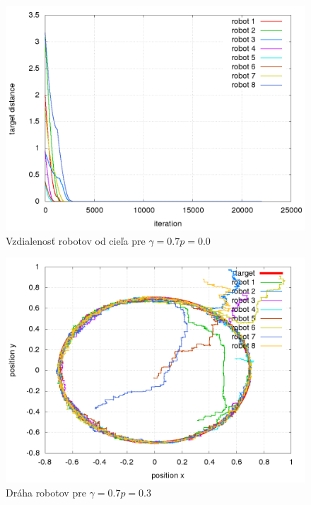 \begin{figure}[!htb]
\centering
\includegraphics[scale=.4]{../../results_q_learning/nano_q_learning/result_00/robot_reward.png}
\caption{Vzdialenosť robotov od cieľa pre $\gamma = 0.7 p = 0.0$}
\label{img:nano_q_result_00_error}
\end{figure}



\begin{figure}[!htb]
\centering
\includegraphics[scale=.4]{../../results_q_learning/nano_q_learning/result_03/robot_path.png}
\caption{Dráha robotov pre $\gamma = 0.7 p = 0.3$}
\label{img:nano_q_result_03_path}
\end{figure}

